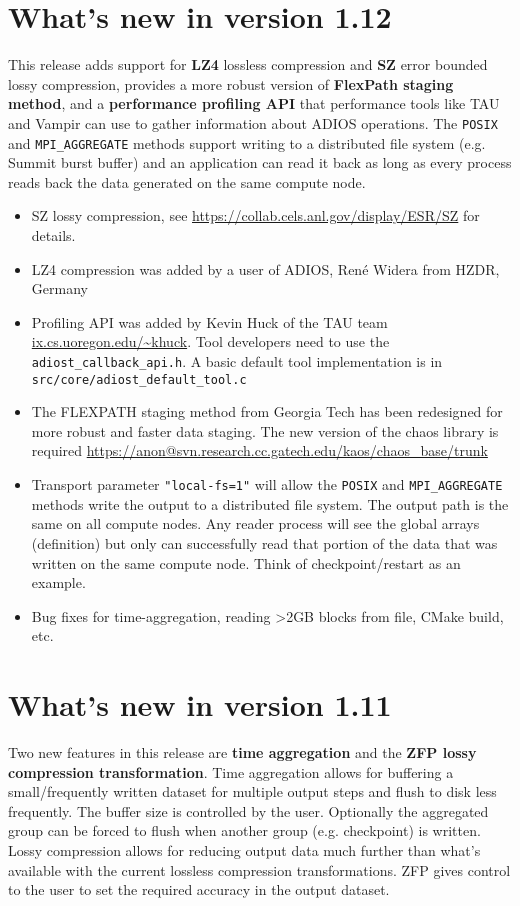 %
%
\section {What's new in version 1.12}
This release adds support for {\bf LZ4} lossless compression and {\bf SZ} error bounded lossy compression, provides a more robust version of {\bf FlexPath staging method}, and a {\bf performance profiling API} that performance tools like TAU and Vampir can use to gather information about ADIOS operations. The \verb+POSIX+ and \verb+MPI_AGGREGATE+ methods support writing to a distributed file system (e.g. Summit burst buffer) and an application can read it back as long as every process reads back the data generated on the same compute node. 

\begin{itemize}
\item SZ lossy compression, see  \url{ https://collab.cels.anl.gov/display/ESR/SZ} for details.
\item LZ4 compression was added by a user of ADIOS, René Widera from HZDR, Germany
\item Profiling API was added by Kevin Huck of the TAU team \url{ix.cs.uoregon.edu/~khuck}. Tool developers need to use the \verb+adiost_callback_api.h+. A basic default tool implementation is in \newline \verb+src/core/adiost_default_tool.c+
\item The FLEXPATH staging method from Georgia Tech has been redesigned for more robust and faster data staging. The new version of the chaos library is required \url{https://anon@svn.research.cc.gatech.edu/kaos/chaos_base/trunk}
\item Transport parameter \verb+"local-fs=1"+ will allow the \verb+POSIX+ and \verb+MPI_AGGREGATE+ methods write the output to a distributed file system. The output path is the same on all compute nodes. Any reader process will see the global arrays (definition) but only can successfully read that portion of the data that was written on the same compute node. Think of checkpoint/restart as an example.
\item Bug fixes for time-aggregation, reading >2GB blocks from file, CMake build, etc.
\end{itemize}



\section {What's new in version 1.11}
Two new features in this release are {\bf time aggregation} and the {\bf ZFP lossy compression transformation}. Time aggregation allows for buffering a small/frequently written dataset for multiple output steps and flush to disk less frequently. The buffer size is controlled by the user. Optionally the aggregated group can be forced to flush when another group (e.g. checkpoint) is written. 
Lossy compression allows for reducing output data much further than what's available with the current lossless compression transformations. ZFP gives control to the user to set the required accuracy in the output dataset.  

